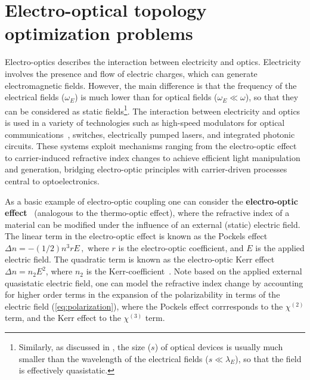 \chapter{Electro-optical topology optimization problems}\label{chap:eo}
Electro-optics describes the interaction between electricity and optics. Electricity involves the presence and flow of electric charges, which can generate electromagnetic fields.
However, the main difference is that the frequency of the electrical fields ($\omega_E$)
is much lower than for optical fields ($\omega_E \ll \omega $), so that they can be considered as static fields\footnote{Similarly, as discussed in , the size ($s$) of optical devices
is usually much smaller than the wavelength of the electrical fields ($s\ll \lambda_E $), so that the field is effectively quasistatic.}.
The interaction between electricity and optics is used in a variety of technologies such as high-speed modulators for optical communications~\cite{modu, modu1, modu2, pockels}, switches\cite{eo_switch}, electrically pumped lasers\cite{laser,laser_pic}, and integrated photonic circuits\cite{laser_pic}. 
These systems exploit mechanisms ranging from the electro-optic effect~\cite{eo_effect} to carrier-induced refractive index
 changes \cite{c_i_n} to achieve efficient light manipulation and generation, bridging electro-optic principles with carrier-driven processes central to optoelectronics.



As a basic example of electro-optic coupling one can consider the \textbf{electro-optic effect}~\cite{eo_effect} (analogous to the thermo-optic effect),
where the refractive index of a material can be modified under the influence of an external (static) electric field. The linear term in the electro-optic effect is known as the
Pockels effect~\cite{pockels} $
    \Delta n = -(1/2) n^3 r E\,,$
where $r$ is the electro-optic coefficient, and $E$ is the applied electric field. The quadratic term 
is known as the electro-optic Kerr effect $\Delta n = n_2 E^2$, where $n_2$ is the Kerr-coefficient~\cite{phot_crys}. Note based on the applied external
quasistatic electric field, one can model the refractive index change by accounting for higher order terms in the expansion of the polarizability
in terms of the electric field (\eqref{eq:polarization}), where the Pockels effect corrresponds to the $\chi^{(2)}$ term, and the Kerr effect to the $\chi^{(3)}$ term.

